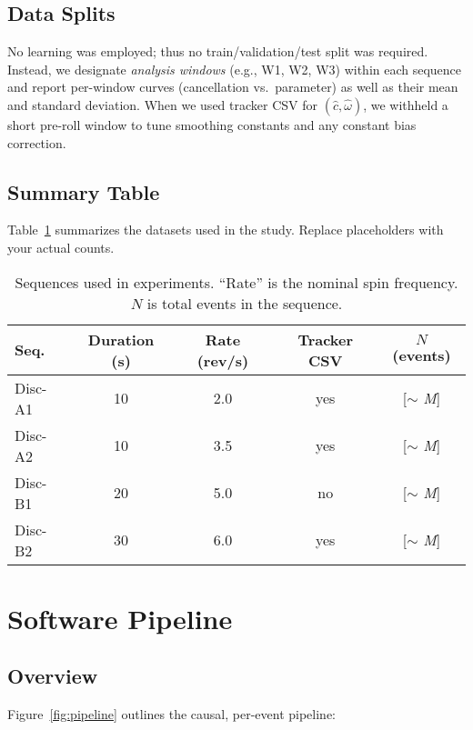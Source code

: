 \subsection{Data Splits}
No learning was employed; thus no train/validation/test split was required. Instead, we designate \emph{analysis windows} (e.g., W1, W2, W3) within each sequence and report per-window curves (cancellation vs.\ parameter) as well as their mean and standard deviation. When we used tracker CSV for $(\hat c,\hat\omega)$, we withheld a short pre-roll window to tune smoothing constants and any constant bias correction.

\subsection{Summary Table}
Table~\ref{tab:sequences} summarizes the datasets used in the study. Replace placeholders with your actual counts.

\begin{table}[H]
  \centering
  \caption{Sequences used in experiments. ``Rate'' is the nominal spin frequency. $N$ is total events in the sequence.}
  \label{tab:sequences}
  \begin{tabular}{lcccc}
    \toprule
    \textbf{Seq.} & \textbf{Duration (s)} & \textbf{Rate (rev/s)} & \textbf{Tracker CSV} & \textbf{$N$ (events)} \\
    \midrule
    Disc-A1 & 10 & 2.0 & yes & [\textit{$\sim$ M}] \\
    Disc-A2 & 10 & 3.5 & yes & [\textit{$\sim$ M}] \\
    Disc-B1 & 20 & 5.0 & no  & [\textit{$\sim$ M}] \\
    Disc-B2 & 30 & 6.0 & yes & [\textit{$\sim$ M}] \\
    \bottomrule
  \end{tabular}
\end{table}

\section{Software Pipeline}
\label{sec:software}

\subsection{Overview}
Figure~\ref{fig:pipeline} outlines the causal, per-event pipeline:

